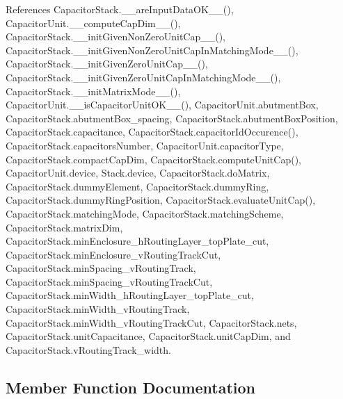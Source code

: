 References Capacitor\+Stack.\+\_\+\+\_\+are\+Input\+Data\+O\+K\+\_\+\+\_\+(), Capacitor\+Unit.\+\_\+\+\_\+compute\+Cap\+Dim\+\_\+\+\_\+(), Capacitor\+Stack.\+\_\+\+\_\+init\+Given\+Non\+Zero\+Unit\+Cap\+\_\+\+\_\+(), Capacitor\+Stack.\+\_\+\+\_\+init\+Given\+Non\+Zero\+Unit\+Cap\+In\+Matching\+Mode\+\_\+\+\_\+(), Capacitor\+Stack.\+\_\+\+\_\+init\+Given\+Zero\+Unit\+Cap\+\_\+\+\_\+(), Capacitor\+Stack.\+\_\+\+\_\+init\+Given\+Zero\+Unit\+Cap\+In\+Matching\+Mode\+\_\+\+\_\+(), Capacitor\+Stack.\+\_\+\+\_\+init\+Matrix\+Mode\+\_\+\+\_\+(), Capacitor\+Unit.\+\_\+\+\_\+is\+Capacitor\+Unit\+O\+K\+\_\+\+\_\+(), Capacitor\+Unit.\+abutment\+Box, Capacitor\+Stack.\+abutment\+Box\+\_\+spacing, Capacitor\+Stack.\+abutment\+Box\+Position, Capacitor\+Stack.\+capacitance, Capacitor\+Stack.\+capacitor\+Id\+Occurence(), Capacitor\+Stack.\+capacitors\+Number, Capacitor\+Unit.\+capacitor\+Type, Capacitor\+Stack.\+compact\+Cap\+Dim, Capacitor\+Stack.\+compute\+Unit\+Cap(), Capacitor\+Unit.\+device, Stack.\+device, Capacitor\+Stack.\+do\+Matrix, Capacitor\+Stack.\+dummy\+Element, Capacitor\+Stack.\+dummy\+Ring, Capacitor\+Stack.\+dummy\+Ring\+Position, Capacitor\+Stack.\+evaluate\+Unit\+Cap(), Capacitor\+Stack.\+matching\+Mode, Capacitor\+Stack.\+matching\+Scheme, Capacitor\+Stack.\+matrix\+Dim, Capacitor\+Stack.\+min\+Enclosure\+\_\+h\+Routing\+Layer\+\_\+top\+Plate\+\_\+cut, Capacitor\+Stack.\+min\+Enclosure\+\_\+v\+Routing\+Track\+Cut, Capacitor\+Stack.\+min\+Spacing\+\_\+v\+Routing\+Track, Capacitor\+Stack.\+min\+Spacing\+\_\+v\+Routing\+Track\+Cut, Capacitor\+Stack.\+min\+Width\+\_\+h\+Routing\+Layer\+\_\+top\+Plate\+\_\+cut, Capacitor\+Stack.\+min\+Width\+\_\+v\+Routing\+Track, Capacitor\+Stack.\+min\+Width\+\_\+v\+Routing\+Track\+Cut, Capacitor\+Stack.\+nets, Capacitor\+Stack.\+unit\+Capacitance, Capacitor\+Stack.\+unit\+Cap\+Dim, and Capacitor\+Stack.\+v\+Routing\+Track\+\_\+width.



\subsection{Member Function Documentation}
\mbox{\label{classpython_1_1capacitormatrix_1_1CapacitorStack_ababc3906986a38853f947e52f870a50c}} 
